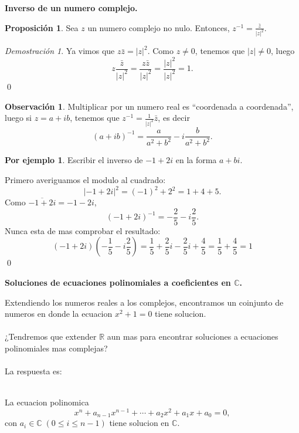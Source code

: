 \documentclass{article}
\theoremstyle{definition}
\theoremstyle{definition}
\newtheorem*{obs}{Observación}
\newtheorem{prop}[teo]{Proposición}
\newtheorem*{ej}{Por ejemplo}
\theoremstyle{remark}
\newtheorem*{demo}{Demostración}
\begin{document}
\begin{center}
\textbf{Inverso de un numero complejo.}
\end{center}
\begin{prop}
  Sea $z$ un numero complejo no nulo. Entonces, $z^{-1}=\frac{\bar{z}}{|z|^2}$.
\end{prop}
\begin{demo}
  Ya vimos que $z\bar{z}=|z|^2$. Como $z \neq 0$, tenemos que $|z|\neq 0$, luego \[
z\frac{\bar{z}}{|z|^2}=\frac{z\bar{z}}{|z|^2}=\frac{|z|^2}{|z|^2}=1.
  \]\qed
\end{demo}
\begin{obs}
  Multiplicar por un numero real es ``coordenada a coordenada'', luego si $z=a+ib$, tenemos que $z^{-1}=\frac{1}{|z|^2}\bar{z}$, es decir\[
(a+ib)^{-1}=\frac{a}{a^2+b^2}-i\frac{b}{a^2+b^2}.
  \]
\end{obs}
\begin{ej}
  Escribir el inverso de $-1+2i$ en la forma $a+bi$.
\end{ej}
Primero averiguamos el modulo al cuadrado: \[
|-1+2i|^2=(-1)^2+2^2=1+4+5.
\]
Como $\overline{-1+2i}=-1-2i$,\[
(-1+2i)^{-1}=-\frac{2}{5}-i\frac{2}{5}.
\]
Nunca esta de mas comprobar el resultado:
\[
(-1+2i)\left(-\frac{1}{5}-i\frac{2}{5}\right)=\frac{1}{5}+\frac{2}{5}i-\frac{2}{5}i+\frac{4}{5}=\frac{1}{5}+\frac{4}{5}=1
\] \qed
\begin{center}
\textbf{Soluciones de ecuaciones polinomiales a coeficientes en $\mathbb{C}$.}
\end{center}
Extendiendo los numeros reales a los complejos, encontramos un coinjunto de numeros en donde la ecuacion $x^2+1=0$ tiene solucion. \\\\
¿Tendremos que extender $\mathbb{R}$ aun mas para encontrar soluciones a ecuaciones polinomiales mas complejas? \\\\
La respuesta es: \begin{teo}\;\\
  La ecuacion polinomica \[
x^n+a_{n-1}x^{n-1}+\cdots+a_2x^2+a_1x+a_0=0,
  \]con $a_i \in \mathbb{C}\; (0 \leq i \leq n-1)$ tiene solucion en $\mathbb{C}$.
\end{teo}
\end{document}
